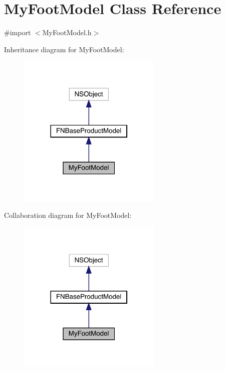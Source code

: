 \hypertarget{interface_my_foot_model}{}\section{My\+Foot\+Model Class Reference}
\label{interface_my_foot_model}


{\ttfamily \#import $<$My\+Foot\+Model.\+h$>$}



Inheritance diagram for My\+Foot\+Model\+:\nopagebreak
\begin{figure}[H]
\begin{center}
\leavevmode
\includegraphics[width=194pt]{interface_my_foot_model__inherit__graph}
\end{center}
\end{figure}


Collaboration diagram for My\+Foot\+Model\+:\nopagebreak
\begin{figure}[H]
\begin{center}
\leavevmode
\includegraphics[width=194pt]{interface_my_foot_model__coll__graph}
\end{center}
\end{figure}
